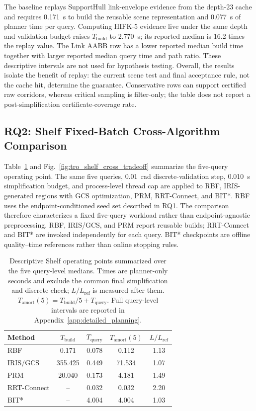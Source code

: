 \documentclass[journal]{IEEEtran}
\newcommand{\rbf}{RBF}
\newcommand{\Tbuild}{\ensuremath{T_{\mathrm{build}}}}
\newcommand{\Tquery}{\ensuremath{T_{\mathrm{query}}}}
\newcommand{\Tamort}[1]{\ensuremath{T_{\mathrm{amort}}(#1)}}
\newcommand{\Lref}{\ensuremath{L_{\mathrm{ref}}}}
\begin{document}
The baseline replays SupportHull link-envelope evidence from the depth-23 cache
and requires 0.171~s to build the reusable scene representation and 0.077~s of
planner time per query. Computing HIFK-5 evidence live under the same depth and
validation budget raises $\Tbuild$ to 2.770~s; its reported median is 16.2
times the replay value. The Link AABB row has a lower reported median build time
together with larger reported median query time and path ratio. These
descriptive intervals are not used for hypothesis testing. Overall, the
results isolate the benefit of replay: the current scene test and final acceptance rule, not the
cache hit, determine the guarantee. Conservative rows can support certified raw
corridors, whereas critical sampling is filter-only; the table does not report
a post-simplification certificate-coverage rate.

\subsection{RQ2: Shelf Fixed-Batch Cross-Algorithm Comparison}
\label{sec:exp_shelf_cross_algorithm}

Table~\ref{tab:tro-shelf-cross-algorithm} and
Fig.~\ref{fig:tro_shelf_cross_tradeoff} summarize the five-query operating
point. The same five queries, 0.01~rad discrete-validation step, 0.010~s
simplification budget, and process-level thread cap are applied to \rbf{},
IRIS-generated regions with GCS optimization, PRM, RRT-Connect, and BIT*. \rbf{}
uses the endpoint-conditioned seed set described in RQ1. The comparison
therefore characterizes a fixed five-query workload rather than endpoint-agnostic
preprocessing. \rbf{}, IRIS/GCS, and PRM report reusable builds; RRT-Connect
and BIT* are invoked independently for each query. BIT* checkpoints are offline quality--time references rather
than online stopping rules.

\begin{table}[!t]
\centering
\caption{Descriptive Shelf operating points summarized over the five
query-level medians. Times are planner-only seconds and exclude the common final
simplification and discrete check; $L/\Lref$ is measured after them.
$\Tamort{5}=\Tbuild/5+\Tquery$. Full query-level intervals are reported in
Appendix~\ref{app:detailed_planning}.}
\label{tab:tro-shelf-cross-algorithm}
\scriptsize
\setlength{\tabcolsep}{3.0pt}
\renewcommand{\arraystretch}{1.04}
\begin{tabular}{@{}lcccc@{}}
\toprule
Method & $\Tbuild$ & $\Tquery$ & $\Tamort{5}$ & $L/\Lref{}$ \\
\midrule
RBF & 0.171 & 0.078 & 0.112 & 1.13 \\
IRIS/GCS & 355.425 & 0.449 & 71.534 & 1.07 \\
PRM & 20.040 & 0.173 & 4.181 & 1.49 \\
RRT-Connect & -- & 0.032 & 0.032 & 2.20 \\
BIT* & -- & 4.004 & 4.004 & 1.03 \\
\bottomrule
\end{tabular}
\end{table}
\end{document}
